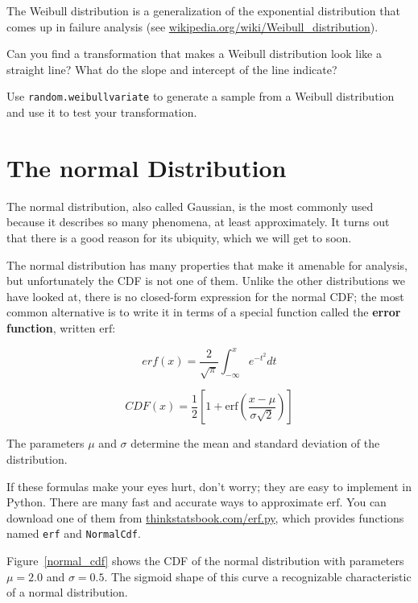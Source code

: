 \documentclass[10pt]{book}
\begin{document}
\begin{ex}

The Weibull distribution is a generalization of the exponential
distribution that comes up in failure analysis
(see \url{wikipedia.org/wiki/Weibull_distribution}).

Can you find a transformation that makes a Weibull distribution look
like a straight line?  What do the slope and intercept of the
line indicate?

Use {\tt random.weibullvariate} to generate a sample from a
Weibull distribution and use it to test your transformation.

\end{ex}




\section{The normal Distribution}

\newcommand{\erf}{\mathrm{erf}}

The normal distribution, also called Gaussian, is the most
commonly used because it describes so many phenomena, at least
approximately.  It turns out that there is a good reason for
its ubiquity, which we will get to soon.

The normal distribution has many properties that make it amenable for
analysis, but unfortunately the CDF is not one of them.  Unlike the
other distributions we have looked at, there is no closed-form
expression for the normal CDF; the most common alternative is to write
it in terms of a special function called the {\bf error function},
written $\erf$:

\[ erf(x) = \frac{2}{\sqrt{\pi}} \int_{-\infty}^x e^{-t^2} dt \]

\[ CDF(x) = \frac{1}{2} \left[ 1 +
  \erf \left( \frac{x - \mu}{\sigma \sqrt{2}} \right) \right] \]

The parameters $\mu$ and $\sigma$ determine the mean and standard
deviation of the distribution.

If these formulas make your eyes hurt, don't worry; they are
easy to implement in Python.  There are many fast and accurate ways
to approximate $\erf$.  You can download one of them from
\url{thinkstatsbook.com/erf.py}, which provides functions
named {\tt erf} and {\tt NormalCdf}.

Figure~\ref{normal_cdf} shows the CDF of the normal distribution
with parameters $\mu=2.0$ and $\sigma=0.5$.  The sigmoid shape of
this curve a recognizable characteristic of a normal distribution.
\end{document}
